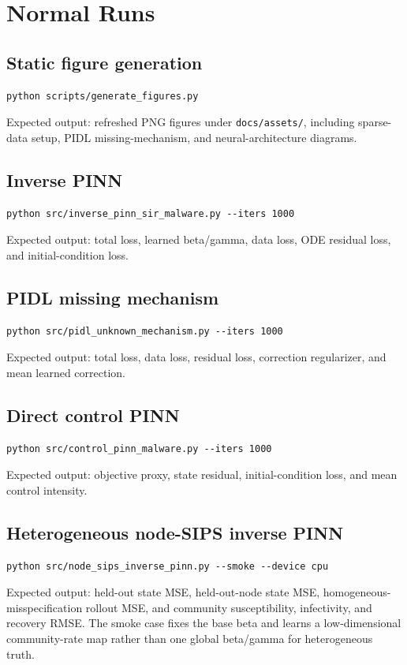\documentclass[11pt,a4paper]{article}
\begin{document}
\section{Normal Runs}
\subsection{Static figure generation}
\begin{lstlisting}[style=pythonstyle]
python scripts/generate_figures.py
\end{lstlisting}
Expected output: refreshed PNG figures under \texttt{docs/assets/}, including sparse-data setup, PIDL missing-mechanism, and neural-architecture diagrams.

\subsection{Inverse PINN}
\begin{lstlisting}[style=pythonstyle]
python src/inverse_pinn_sir_malware.py --iters 1000
\end{lstlisting}
Expected output: total loss, learned beta/gamma, data loss, ODE residual loss, and initial-condition loss.

\subsection{PIDL missing mechanism}
\begin{lstlisting}[style=pythonstyle]
python src/pidl_unknown_mechanism.py --iters 1000
\end{lstlisting}
Expected output: total loss, data loss, residual loss, correction regularizer, and mean learned correction.

\subsection{Direct control PINN}
\begin{lstlisting}[style=pythonstyle]
python src/control_pinn_malware.py --iters 1000
\end{lstlisting}
Expected output: objective proxy, state residual, initial-condition loss, and mean control intensity.

\subsection{Heterogeneous node-SIPS inverse PINN}
\begin{lstlisting}[style=pythonstyle]
python src/node_sips_inverse_pinn.py --smoke --device cpu
\end{lstlisting}
Expected output: held-out state MSE, held-out-node state MSE, homogeneous-misspecification rollout MSE, and community susceptibility, infectivity, and recovery RMSE. The smoke case fixes the base beta and learns a low-dimensional community-rate map rather than one global beta/gamma for heterogeneous truth.
\end{document}
